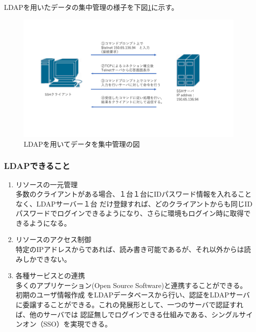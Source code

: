 \documentclass[12pt,a4paper,titlepage]{jreport}
\begin{document}
LDAPを用いたデータの集中管理の様子を下図\ref{LDAP_data_manage}に示す。
\begin{figure}[h]
    \centering
    \includegraphics[width=1.0\textwidth, page=10]{graphs/network_archtecture.pdf}
    \caption{LDAPを用いてデータを集中管理の図}
    \label{LDAP_data_manage}
\end{figure}


\subsubsection*{LDAPできること}
\begin{enumerate}
    \item リソースの一元管理\mbox{}\\多数のクライアントがある場合、１台１台にIDパスワード情報を入れることなく、LDAPサーバー１台
だけ登録すれば、どのクライアントからも同じIDパスワードでログインできるようになり、さらに環境もログイン時に取得できるようになる。


    \item リソースのアクセス制御\mbox{}\\特定のIPアドレスからであれば、読み書き可能であるが、それ以外からは読みしかできない。
    \item 各種サービスとの連携\mbox{}\\多くのアプリケーション(Open Source Software)と連携することができる。初期のユーザ情報作成
をLDAPデータベースから行い、認証をLDAPサーバに委譲することができる。これの発展形として、一つのサーバで認証すれば、他のサーバでは
認証無しでログインできる仕組みである、シングルサインオン（SSO）を実現できる。
\end{enumerate}
\end{document}
